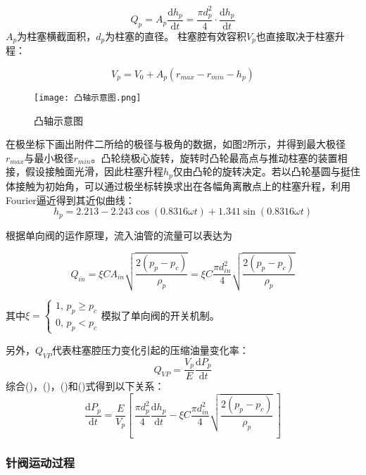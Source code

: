 \documentclass[withoutpreface,bwprint]{cumcmthesis} %
\begin{document}
			\begin{equation}Q_p = A_p \frac{\mathrm{d}h_p}{\mathrm{d}t} = \frac{\pi d_p^2}{4} \cdot \frac{\mathrm{d}h_p}{\mathrm{d}t}\end{equation}
			$A_p$为柱塞横截面积，$d_p$为柱塞的直径。
			柱塞腔有效容积$V_p$也直接取决于柱塞升程：
			
			\begin{equation}V_p = V_0 + A_p (r_{max} - r_{min} - h_p)\end{equation}
			
			\begin{figure}[!htbp]
				\centering
				\texttt{[image: 凸轴示意图.png]}
				\caption{凸轴示意图}
			\end{figure}
		
			在极坐标下画出附件二所给的极径与极角的数据，如图2所示，并得到最大极径$r_{max}$与最小极径$r_{min}$。凸轮绕极心旋转，旋转时凸轮最高点与推动柱塞的装置相接，假设接触面光滑，因此柱塞升程$h_p$仅由凸轮的旋转决定。若以凸轮基圆与挺住体接触为初始角，可以通过极坐标转换求出在各幅角离散点上的柱塞升程，利用Fourier逼近得到其近似曲线：
			\begin{equation}h_p = 2.213 - 2.243 \cos(0.8316 \omega t) + 1.341 \sin(0.8316 \omega t)\end{equation}
			
			根据单向阀的运作原理，流入油管的流量可以表达为
			
			\begin{equation}Q_{in} = \xi CA_{in} \sqrt{\frac{2(p_p - p_c)}{\rho_p}} = \xi C \frac{\pi d_{in}^2}{4} \sqrt{\frac{2(p_p - p_c)}{\rho_p}}\end{equation}
			
			其中$\xi = \left\{ \begin{aligned}  1, \, p_p \geq p_c \\ 0, \, p_p < p_c \end{aligned} \right.$模拟了单向阀的开关机制。
			
			另外，$Q_{VP}$代表柱塞腔压力变化引起的压缩油量变化率：
			$$
			Q_{VP} = \frac{V_p}{E} \frac{\mathrm{d}P_p}{\mathrm{d}t}
			$$
			综合()，()，()和()式得到以下关系：
			$$
			\frac{\mathrm{d}P_p}{\mathrm{d}t} = \frac{E}{V_p} \left[ \, \frac{\pi d_p^2}{4}  \frac{\mathrm{d}h_p}{\mathrm{d}t} - \xi C \frac{\pi d_{in}^2}{4} \sqrt{\frac{2(p_p - p_c)}{\rho_p}} \, \right]
			$$
			
			
			\subsubsection{针阀运动过程}
			
\end{document}
